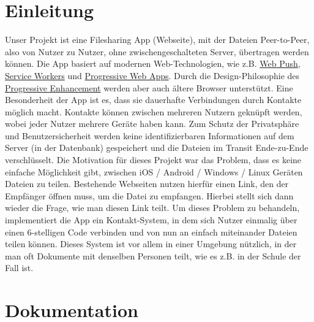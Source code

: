\documentclass[a4paper]{article}
\begin{document}


\setcounter{tocdepth}{2}
\tableofcontents
\newpage

\section{Einleitung}
Unser Projekt ist eine Filesharing App (Webseite), mit der Dateien Peer-to-Peer,
also von Nutzer zu Nutzer, ohne zwischengeschalteten Server, übertragen werden
können. Die App basiert auf modernen Web-Technologien, wie z.B.
\href{https://web.dev/push-notifications-web-push-protocol/}{Web Push},
\href{https://web.dev/learn/pwa/service-workers/}{Service Workers} und
\href{https://web.dev/progressive-web-apps/}{Progressive Web Apps}. Durch die
Design-Philosophie des
\href{https://developer.mozilla.org/en-US/docs/Glossary/Progressive_Enhancement}{Progressive
      Enhancement} werden aber auch ältere Browser unterstützt. Eine Besonderheit der
App ist es, dass sie dauerhafte Verbindungen durch Kontakte möglich macht.
Kontakte können zwischen mehreren Nutzern geknüpft werden, wobei jeder Nutzer
mehrere Geräte haben kann. Zum Schutz der Privatsphäre und Benutzersicherheit
werden keine identifizierbaren Informationen auf dem Server (in der Datenbank)
gespeichert und die Dateien im Transit Ende-zu-Ende verschlüsselt. Die
Motivation für dieses Projekt war das Problem, dass es keine einfache
Möglichkeit gibt, zwischen iOS / Android / Windows / Linux Geräten Dateien zu
teilen. Bestehende Webseiten nutzen hierfür einen Link, den der Empfänger öffnen
muss, um die Datei zu empfangen. Hierbei stellt sich dann wieder die Frage, wie
man diesen Link teilt. Um dieses Problem zu behandeln, implementiert die App ein
Kontakt-System, in dem sich Nutzer einmalig über einen 6-stelligen Code
verbinden und von nun an einfach miteinander Dateien teilen können. Dieses
System ist vor allem in einer Umgebung nützlich, in der man oft Dokumente mit
denselben Personen teilt, wie es z.B. in der Schule der Fall ist.

\section{Dokumentation}
\end{document}
